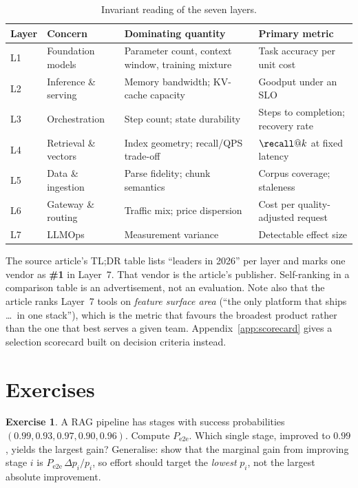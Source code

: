 \documentclass[11pt,twoside,openright]{book}
\theoremstyle{definition}
\newtheorem{exercise}{Exercise}[chapter]
\theoremstyle{plain}
\theoremstyle{remark}
\begin{document}
\begin{table}[H]
\centering
\small
\renewcommand{\arraystretch}{1.35}
\begin{tabularx}{\textwidth}{@{}p{1.1cm} p{3.1cm} X p{3.4cm}@{}}
\toprule
\textbf{Layer} & \textbf{Concern} & \textbf{Dominating quantity} & \textbf{Primary metric} \\
\midrule
L1 & Foundation models & Parameter count, context window, training mixture &
     Task accuracy per unit cost \\
L2 & Inference \& serving & Memory bandwidth; KV-cache capacity &
     Goodput under an SLO \\
L3 & Orchestration & Step count; state durability &
     Steps to completion; recovery rate \\
L4 & Retrieval \& vectors & Index geometry; recall/QPS trade-off &
     $\recall@k$ at fixed latency \\
L5 & Data \& ingestion & Parse fidelity; chunk semantics &
     Corpus coverage; staleness \\
L6 & Gateway \& routing & Traffic mix; price dispersion &
     Cost per quality-adjusted request \\
L7 & LLMOps & Measurement variance &
     Detectable effect size \\
\bottomrule
\end{tabularx}
\caption{Invariant reading of the seven layers.}
\label{tab:invariants}
\end{table}

\begin{vendorwatch}
The source article's TL;DR table lists ``leaders in 2026'' per layer and marks
one vendor as \textbf{\#1} in Layer~7. That vendor is the article's publisher.
Self-ranking in a comparison table is an advertisement, not an evaluation. Note
also that the article ranks Layer~7 tools on \emph{feature surface area}
(``the only platform that ships \dots\ in one stack''), which is the metric that
favours the broadest product rather than the one that best serves a given team.
Appendix~\ref{app:scorecard} gives a selection scorecard built on decision
criteria instead.
\end{vendorwatch}

\section{Exercises}

\begin{exercise}
A RAG pipeline has stages with success probabilities
$(0.99, 0.93, 0.97, 0.90, 0.96)$. Compute $P_{\text{e2e}}$. Which single stage,
improved to $0.99$, yields the largest gain? Generalise: show that the marginal
gain from improving stage $i$ is $P_{\text{e2e}}\,\Delta p_i / p_i$, so effort
should target the \emph{lowest} $p_i$, not the largest absolute improvement.
\end{exercise}
\end{document}
